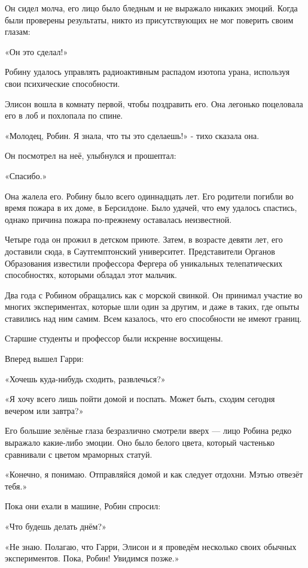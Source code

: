 \documentclass[a5paper, 9pt,
final, openany, twoside=true]{memoir}
\begin{document}
Он сидел молча, его лицо было бледным и не выражало никаких эмоций. Когда были проверены результаты, никто из присутствующих не мог поверить своим глазам:\bigskip

«Он это сделал!»\bigskip

Робину удалось управлять радиоактивным распадом изотопа урана, используя свои психические способности.

Элисон вошла в комнату первой, чтобы поздравить его. Она легонько поцеловала его в лоб и похлопала по спине.

«Молодец, Робин. Я знала, что ты это сделаешь!» - тихо сказала она.\bigskip

Он посмотрел на неё, улыбнулся и прошептал:

«Спасибо.»

Она жалела его. Робину было всего одиннадцать лет. Его родители погибли во время пожара в их доме, в Берсилдоне. Было удачей, что ему удалось спастись, однако причина пожара по-прежнему оставалась неизвестной.

Четыре года он прожил в детском приюте. Затем, в возрасте девяти лет, его доставили сюда, в Саутгемптонский университет. Представители Органов Образования известили профессора Фергера об уникальных телепатических способностях, которыми обладал этот мальчик.

Два года с Робином обращались как с морской свинкой. Он принимал участие во многих экспериментах, которые шли один за другим, и даже в таких, где опыты ставились над ним самим. Всем казалось, что его способности не имеют границ.\bigskip

Старшие студенты и профессор были искренне восхищены.

Вперед вышел Гарри:

«Хочешь куда-нибудь сходить, развлечься?»

«Я хочу всего лишь пойти домой и поспать. Может быть, сходим сегодня вечером или завтра?»

Его большие зелёные глаза безразлично смотрели вверх — лицо Робина редко выражало какие-либо эмоции. Оно было белого цвета, который частенько сравнивали с цветом мраморных статуй.

«Конечно, я понимаю. Отправляйся домой и как следует отдохни. Мэтью отвезёт тебя.»\bigskip

Пока они ехали в машине, Робин спросил:

«Что будешь делать днём?»

«Не знаю. Полагаю, что Гарри, Элисон и я проведём несколько своих обычных экспериментов. Пока, Робин! Увидимся позже.»
\end{document}
